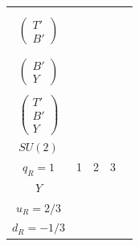 \begin{table}[htb]
\begin{tabular}{|c|c|c|c|c|}
{         \vphantom{$\begin{pmatrix}B'\end{pmatrix}$} \\
         \vphantom{$\begin{pmatrix}Y\end{pmatrix}$} 
         }
         \thead{
         \vphantom{$\begin{pmatrix}X\end{pmatrix}$} \\
         $\begin{pmatrix} T' \\ B' \end{pmatrix}$ \\
         \vphantom{$\begin{pmatrix}Y\end{pmatrix}$} 
         }
         \thead{
         \vphantom{$\begin{pmatrix}X\end{pmatrix}$} \\
         \vphantom{$\begin{pmatrix}T'\end{pmatrix}$} \\
         $\begin{pmatrix} B' \\ Y \end{pmatrix}$
         }
         & 
         \thead{
         $\begin{pmatrix} X \\ T' \\ B' \end{pmatrix}$ \\
         \vphantom{$\begin{pmatrix}Y\end{pmatrix}$} 
         }
         \thead{
         \vphantom{$\begin{pmatrix}X \end{pmatrix}$} \\
         $\begin{pmatrix} T' \\ B' \\ Y \end{pmatrix}$
         } 
         \\
         \hline
         $SU(2)$ & \thead{$q_{L}=2$ \\ $q_{R}=1$} & 1 & 2 & 3 \\
         \hline
         $Y$ & \thead{$q_{L}=1/6$ \\ $u_{R}=2/3$ \\ $d_{R}=-1/3$} &

\end{tabular}
\end{table}
